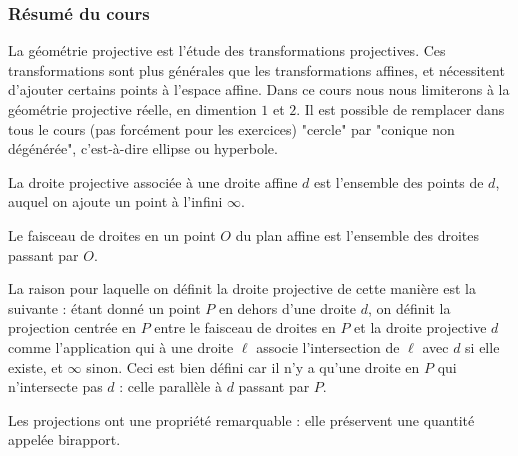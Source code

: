 
\subsubsection{Résumé du cours}

La géométrie projective est l'étude des transformations projectives. Ces transformations sont plus générales que les transformations affines, et nécessitent d'ajouter certains points à l'espace affine. Dans ce cours nous nous limiterons à la géométrie projective réelle, en dimention $1$ et $2$. Il est possible de remplacer dans tous le cours (pas forcément pour les exercices) "cercle" par "conique non dégénérée", c'est-à-dire ellipse ou hyperbole.


\begin{dfn}
La droite projective associée à une droite affine $d$ est l'ensemble des points de $d$, auquel on ajoute un point à l'infini $\infty$.

\medskip

Le faisceau de droites en un point $O$ du plan affine est l'ensemble des droites passant par $O$.
\end{dfn}

La raison pour laquelle on définit la droite projective de cette manière est la suivante : étant donné un point $P$ en dehors d'une droite $d$, on définit la projection centrée en $P$ entre le faisceau de droites en $P$ et la droite projective $d$ comme l'application qui à une droite $\ell$ associe l'intersection de $\ell$ avec $d$ si elle existe, et $\infty$ sinon. Ceci est bien défini car il n'y a qu'une droite en $P$ qui n'intersecte pas $d$ : celle parallèle à $d$ passant par $P$.

\medskip

Les projections ont une propriété remarquable : elle préservent une quantité appelée birapport.

